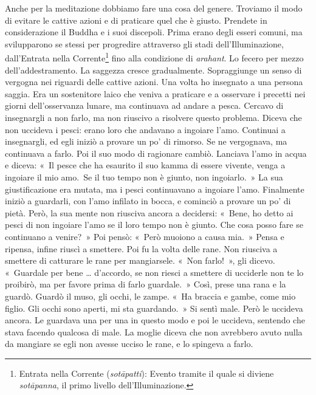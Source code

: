 Anche per la meditazione dobbiamo fare una cosa del genere. Troviamo il
modo di evitare le cattive azioni e di praticare quel che è giusto.
Prendete in considerazione il Buddha e i suoi discepoli. Prima erano
degli esseri comuni, ma svilupparono se stessi per progredire attraverso
gli stadi dell'Illuminazione, dall'Entrata nella Corrente\footnote{Entrata
  nella Corrente (\emph{sotāpatti}): Evento tramite il quale si diviene
  \emph{sotāpanna}, il primo livello dell'Illuminazione.} fino alla
condizione di \emph{arahant}. Lo fecero per mezzo dell'addestramento.
La saggezza cresce gradualmente. Sopraggiunge un senso di vergogna nei
riguardi delle cattive azioni. Una volta ho insegnato a una persona
saggia. Era un sostenitore laico che veniva a praticare e a osservare i
precetti nei giorni dell'osservanza lunare, ma continuava ad andare a
pesca. Cercavo di insegnargli a non farlo, ma non riuscivo a risolvere
questo problema. Diceva che non uccideva i pesci: erano loro che
andavano a ingoiare l'amo. Continuai a insegnargli, ed egli iniziò a
provare un po' di rimorso. Se ne vergognava, ma continuava a farlo. Poi
il suo modo di ragionare cambiò. Lanciava l'amo in acqua e diceva: «~Il
pesce che ha esaurito il suo kamma di essere vivente, venga a
ingoiare il mio amo.~Se il tuo tempo non è giunto, non ingoiarlo.~» La
sua giustificazione era mutata, ma i pesci continuavano a ingoiare
l'amo. Finalmente iniziò a guardarli, con l'amo infilato in bocca, e
cominciò a provare un po' di pietà. Però, la sua mente non riusciva
ancora a decidersi: «~Bene, ho detto ai pesci di non ingoiare l'amo se
il loro tempo non è giunto. Che cosa posso fare se continuano a
venire?~» Poi pensò: «~Però muoiono a causa mia.~» Pensa e ripensa,
infine riuscì a smettere. Poi fu la volta delle rane. Non riusciva a
smettere di catturare le rane per mangiarsele. «~Non farlo!~», gli
dicevo. «~Guardale per bene \ldots{} d'accordo, se non riesci a smettere di
ucciderle non te lo proibirò, ma per favore prima di farlo guardale.~»
Così, prese una rana e la guardò. Guardò il muso, gli occhi, le zampe.
«~Ha braccia e gambe, come mio figlio. Gli occhi sono aperti, mi sta
guardando.~» Si sentì male. Però le uccideva ancora. Le guardava una per
una in questo modo e poi le uccideva, sentendo che stava facendo
qualcosa di male. La moglie diceva che non avrebbero avuto nulla da
mangiare se egli non avesse ucciso le rane, e lo spingeva a farlo.

